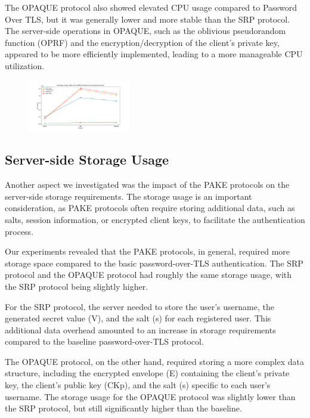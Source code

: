 The OPAQUE protocol also showed elevated CPU usage compared to Password Over TLS, but it was generally lower and more stable than the SRP protocol. The server-side operations in OPAQUE, such as the oblivious pseudorandom function (OPRF) and the encryption/decryption of the client's private key, appeared to be more efficiently implemented, leading to a more manageable CPU utilization.

\begin{figure}[ht]
  \centering
  \includegraphics[width=0.4\textwidth]{./images/database_usage_metrics_line.png}
  \label{fig:storage_usage}
\end{figure}

\subsection{Server-side Storage Usage}

Another aspect we investigated was the impact of the PAKE protocols on the server-side storage requirements. The storage usage is an important consideration, as PAKE protocols often require storing additional data, such as salts, session information, or encrypted client keys, to facilitate the authentication process.

Our experiments revealed that the PAKE protocols, in general, required more storage space compared to the basic password-over-TLS authentication. The SRP protocol and the OPAQUE protocol had roughly the same storage usage, with the SRP protocol being slightly higher.

For the SRP protocol, the server needed to store the user's username, the generated secret value (V), and the salt (s) for each registered user. This additional data overhead amounted to an increase in storage requirements compared to the baseline password-over-TLS protocol.

The OPAQUE protocol, on the other hand, required storing a more complex data structure, including the encrypted envelope (E) containing the client's private key, the client's public key (CKp), and the salt (s) specific to each user's username. The storage usage for the OPAQUE protocol was slightly lower than the SRP protocol, but still significantly higher than the baseline.

